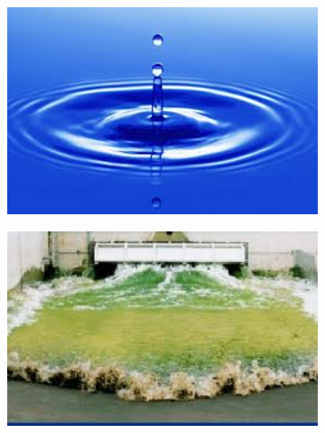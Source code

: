 \documentclass{beamer}
\begin{document}
\begin{frame}
 		\begin{figure}
 			\begin{subfigure}[c]{0.3\textwidth}
 		 	      \includegraphics[width=1\textwidth]{pic/images.jpg}
 		 	\end{subfigure} 		 	
 		 	 \begin{subfigure}[c]{0.3\textwidth}
 		 	      \includegraphics[width=1\textwidth]{pic/images1.jpg}
 		 	\end{subfigure}
 		 	
 		 	\vspace{1em}
 		 	

\end{figure}
\end{frame}
\end{document}
